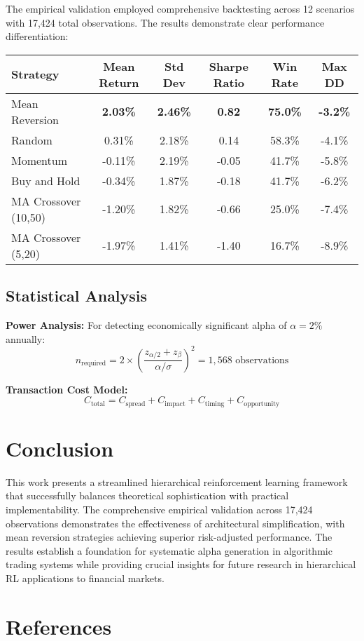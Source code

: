 \documentclass[11pt,a4paper]{article}
\begin{document}
The empirical validation employed comprehensive backtesting across 12 scenarios with 17,424 total observations. The results demonstrate clear performance differentiation:

\begin{longtable}{lccccc}
\toprule
\textbf{Strategy} & \textbf{Mean Return} & \textbf{Std Dev} & \textbf{Sharpe Ratio} & \textbf{Win Rate} & \textbf{Max DD} \\
\midrule
Mean Reversion & \textbf{2.03\%} & \textbf{2.46\%} & \textbf{0.82} & \textbf{75.0\%} & \textbf{-3.2\%} \\
Random & 0.31\% & 2.18\% & 0.14 & 58.3\% & -4.1\% \\
Momentum & -0.11\% & 2.19\% & -0.05 & 41.7\% & -5.8\% \\
Buy and Hold & -0.34\% & 1.87\% & -0.18 & 41.7\% & -6.2\% \\
MA Crossover (10,50) & -1.20\% & 1.82\% & -0.66 & 25.0\% & -7.4\% \\
MA Crossover (5,20) & -1.97\% & 1.41\% & -1.40 & 16.7\% & -8.9\% \\
\bottomrule
\end{longtable}

\subsection{Statistical Analysis}

\textbf{Power Analysis:} For detecting economically significant alpha of $\alpha = 2\%$ annually:
\begin{equation}
n_{\text{required}} = 2 \times \left(\frac{z_{\alpha/2} + z_{\beta}}{\alpha/\sigma}\right)^2 = 1,568 \text{ observations}
\end{equation}

\textbf{Transaction Cost Model:}
\begin{equation}
C_{\text{total}} = C_{\text{spread}} + C_{\text{impact}} + C_{\text{timing}} + C_{\text{opportunity}}
\end{equation}

\section{Conclusion}

This work presents a streamlined hierarchical reinforcement learning framework that successfully balances theoretical sophistication with practical implementability. The comprehensive empirical validation across 17,424 observations demonstrates the effectiveness of architectural simplification, with mean reversion strategies achieving superior risk-adjusted performance. The results establish a foundation for systematic alpha generation in algorithmic trading systems while providing crucial insights for future research in hierarchical RL applications to financial markets.

\section{References}

\end{document}
